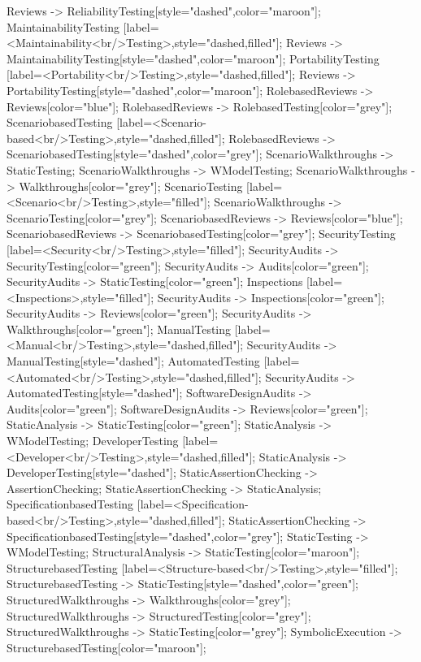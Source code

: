 \documentclass{article}
\begin{document}
{Reviews -> ReliabilityTesting[style="dashed",color="maroon"];
MaintainabilityTesting [label=<Maintainability<br/>Testing>,style="dashed,filled"];
Reviews -> MaintainabilityTesting[style="dashed",color="maroon"];
PortabilityTesting [label=<Portability<br/>Testing>,style="dashed,filled"];
Reviews -> PortabilityTesting[style="dashed",color="maroon"];
RolebasedReviews -> Reviews[color="blue"];
RolebasedReviews -> RolebasedTesting[color="grey"];
ScenariobasedTesting [label=<Scenario-based<br/>Testing>,style="dashed,filled"];
RolebasedReviews -> ScenariobasedTesting[style="dashed",color="grey"];
ScenarioWalkthroughs -> StaticTesting;
ScenarioWalkthroughs -> WModelTesting;
ScenarioWalkthroughs -> Walkthroughs[color="grey"];
ScenarioTesting [label=<Scenario<br/>Testing>,style="filled"];
ScenarioWalkthroughs -> ScenarioTesting[color="grey"];
ScenariobasedReviews -> Reviews[color="blue"];
ScenariobasedReviews -> ScenariobasedTesting[color="grey"];
SecurityTesting [label=<Security<br/>Testing>,style="filled"];
SecurityAudits -> SecurityTesting[color="green"];
SecurityAudits -> Audits[color="green"];
SecurityAudits -> StaticTesting[color="green"];
Inspections [label=<Inspections>,style="filled"];
SecurityAudits -> Inspections[color="green"];
SecurityAudits -> Reviews[color="green"];
SecurityAudits -> Walkthroughs[color="green"];
ManualTesting [label=<Manual<br/>Testing>,style="dashed,filled"];
SecurityAudits -> ManualTesting[style="dashed"];
AutomatedTesting [label=<Automated<br/>Testing>,style="dashed,filled"];
SecurityAudits -> AutomatedTesting[style="dashed"];
SoftwareDesignAudits -> Audits[color="green"];
SoftwareDesignAudits -> Reviews[color="green"];
StaticAnalysis -> StaticTesting[color="green"];
StaticAnalysis -> WModelTesting;
DeveloperTesting [label=<Developer<br/>Testing>,style="dashed,filled"];
StaticAnalysis -> DeveloperTesting[style="dashed"];
StaticAssertionChecking -> AssertionChecking;
StaticAssertionChecking -> StaticAnalysis;
SpecificationbasedTesting [label=<Specification-based<br/>Testing>,style="dashed,filled"];
StaticAssertionChecking -> SpecificationbasedTesting[style="dashed",color="grey"];
StaticTesting -> WModelTesting;
StructuralAnalysis -> StaticTesting[color="maroon"];
StructurebasedTesting [label=<Structure-based<br/>Testing>,style="filled"];
StructurebasedTesting -> StaticTesting[style="dashed",color="green"];
StructuredWalkthroughs -> Walkthroughs[color="grey"];
StructuredWalkthroughs -> StructuredTesting[color="grey"];
StructuredWalkthroughs -> StaticTesting[color="grey"];
SymbolicExecution -> StructurebasedTesting[color="maroon"];
}
\end{document}
